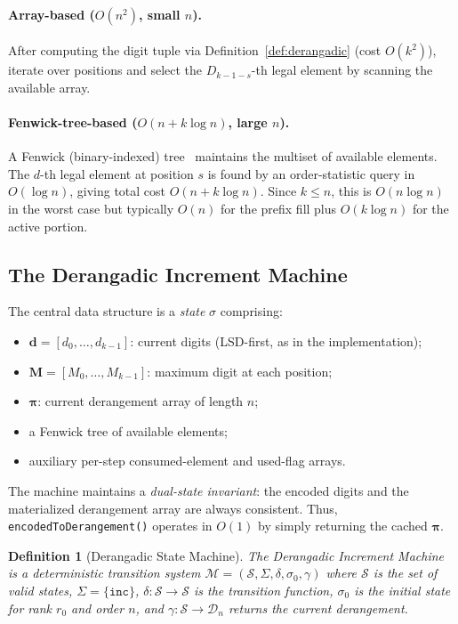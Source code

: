 \documentclass[11pt,a4paper]{article}
\newtheorem{definition}{Definition}[section]
\begin{document}
    \paragraph{Array-based ($O(n^2)$, small $n$).}
    After computing the digit tuple via Definition~\ref{def:derangadic}
    (cost $O(k^2)$), iterate over positions and select the $D_{k-1-s}$-th
    legal element by scanning the available array.

    \paragraph{Fenwick-tree-based ($O(n + k \log n)$, large $n$).}
    A Fenwick (binary-indexed) tree~\cite{fenwick1994} maintains the multiset
    of available elements. The $d$-th legal element at position $s$ is found
    by an order-statistic query in $O(\log n)$, giving total cost
    $O(n + k \log n)$. Since $k \leq n$, this is $O(n \log n)$ in the worst case
    but typically $O(n)$ for the prefix fill plus $O(k \log n)$ for the active
    portion.

    \subsection{The Derangadic Increment Machine}
    \label{sec:increment}

    The central data structure is a \emph{state} $\sigma$ comprising:
    \begin{itemize}
        \item $\mathbf{d} = [d_0, \dots, d_{k-1}]$: current digits (LSD-first, as in the implementation);
        \item $\mathbf{M} = [M_0, \dots, M_{k-1}]$: maximum digit at each position;
        \item $\boldsymbol{\pi}$: current derangement array of length $n$;
        \item a Fenwick tree of available elements;
        \item auxiliary per-step consumed-element and used-flag arrays.
    \end{itemize}

    The machine maintains a \emph{dual-state invariant}: the encoded digits and
    the materialized derangement array are always consistent. Thus,
    \texttt{encodedToDerangement()} operates in $O(1)$ by simply returning the
    cached $\boldsymbol{\pi}$.

    \begin{definition}[Derangadic State Machine]
        \label{def:state-machine}
        The \emph{Derangadic Increment Machine} is a deterministic transition
        system $\mathcal{M} = (\mathcal{S}, \Sigma, \delta, \sigma_0, \gamma)$ where
        $\mathcal{S}$ is the set of valid states, $\Sigma = \{\texttt{inc}\}$,
        $\delta: \mathcal{S} \to \mathcal{S}$ is the transition function,
        $\sigma_0$ is the initial state for rank $r_0$ and order $n$, and
        $\gamma: \mathcal{S} \to \mathcal{D}_n$ returns the current derangement.
    \end{definition}
\end{document}
